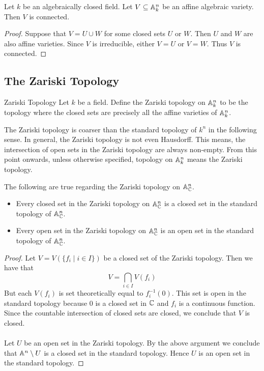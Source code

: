\documentclass[a4paper]{article}
\begin{document}
\begin{prp}{}{} Let $k$ be an algebraically closed field. Let $V\subseteq\mathbb{A}_k^n$ be an affine algebraic variety. Then $V$ is connected. \tcbline
\begin{proof}
Suppose that $V=U\cup W$ for some closed sets $U$ or $W$. Then $U$ and $W$ are also affine varieties. Since $V$ is irreducible, either $V=U$ or $V=W$. Thus $V$ is connected. 
\end{proof}
\end{prp}

\subsection{The Zariski Topology}
\begin{defn}{Zariski Topology}{} Let $k$ be a field. Define the Zariski topology on $\mathbb{A}_k^n$ to be the topology where the closed sets are precisely all the affine varieties of $\mathbb{A}_k^n$. 
\end{defn}

The Zariski topology is coarser than the standard topology of $k^n$ in the following sense. In general, the Zariski topology is not even Hausdorff. This means, the intersection of open sets in the Zariski topology are always non-empty. From this point onwards, unless otherwise specified, topology on $\mathbb{A}_k^n$ means the Zariski topology. 

\begin{lmm}{}{} The following are true regarding the Zariski topology on $\mathbb{A}_{\mathbb{C}}^n$. 
\begin{itemize}
\item Every closed set in the Zariski topology on $\mathbb{A}_{\mathbb{C}}^n$ is a closed set in the standard topology of $\mathbb{A}_{\mathbb{C}}^n$. 
\item Every open set in the Zariski topology on $\mathbb{A}_{\mathbb{C}}^n$ is an open set in the standard topology of $\mathbb{A}_{\mathbb{C}}^n$. 
\end{itemize} \tcbline
\begin{proof}
Let $V=V(\{f_i\;|\;i\in I\})$ be a closed set of the Zariski topology. Then we have that $$V=\bigcap_{i\in I}V(f_i)$$ But each $V(f_i)$ is set theoretically equal to $f_i^{-1}(0)$. This set is open in the standard topology because $0$ is a closed set in $\mathbb{C}$ and $f_i$ is a continuous function. Since the countable intersection of closed sets are closed, we conclude that $V$ is closed. \\~\\

Let $U$ be an open set in the Zariski topology. By the above argument we conclude that $\mathbb{A}^n\setminus U$ is a closed set in the standard topology. Hence $U$ is an open set in the standard topology. 
\end{proof}
\end{lmm}
\end{document}
